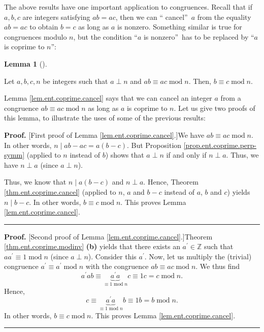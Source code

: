 \documentclass[numbers=enddot,12pt,final,onecolumn,notitlepage]{scrartcl}%
\numberwithin{exer}{subsection}
\theoremstyle{definition}
\newtheorem{lem}[theo]{Lemma}
\newenvironment{lemma}[1][]
{\begin{lem}[#1]\begin{leftbar}}
{\end{leftbar}\end{lem}}
\newenvironment{proof}[1][Proof]{\noindent\textbf{#1.} }{\ \rule{0.5em}{0.5em}}
\begin{document}
The above results have one important application to congruences. Recall that
if $a,b,c$ are integers satisfying $ab=ac$, then we can \textquotedblleft
cancel\textquotedblright\ $a$ from the equality $ab=ac$ to obtain $b=c$ as
long as $a$ is nonzero. Something similar is true for congruences modulo $n$,
but the condition \textquotedblleft$a$ is nonzero\textquotedblright\ has to be
replaced by \textquotedblleft$a$ is coprime to $n$\textquotedblright:

\begin{lemma}
\label{lem.ent.coprime.cancel}Let $a,b,c,n$ be integers such that $a\perp n$
and $ab\equiv ac\operatorname{mod}n$. Then, $b\equiv c\operatorname{mod}n$.
\end{lemma}

Lemma \ref{lem.ent.coprime.cancel} says that we can cancel an integer $a$ from
a congruence $ab\equiv ac\operatorname{mod}n$ as long as $a$ is coprime to
$n$. Let us give two proofs of this lemma, to illustrate the uses of some of
the previous results:

\begin{proof}
[First proof of Lemma \ref{lem.ent.coprime.cancel}.]We have $ab\equiv
ac\operatorname{mod}n$. In other words, $n\mid ab-ac=a\left(  b-c\right)  $.
But Proposition \ref{prop.ent.coprime.perp-symm} (applied to $n$ instead of
$b$) shows that $a\perp n$ if and only if $n\perp a$. Thus, we have $n\perp a$
(since $a\perp n$).

Thus, we know that $n\mid a\left(  b-c\right)  $ and $n\perp a$. Hence,
Theorem \ref{thm.ent.coprime.cancel} (applied to $n$, $a$ and $b-c$ instead of
$a$, $b$ and $c$) yields $n\mid b-c$. In other words, $b\equiv
c\operatorname{mod}n$. This proves Lemma \ref{lem.ent.coprime.cancel}.
\end{proof}

\begin{proof}
[Second proof of Lemma \ref{lem.ent.coprime.cancel}.]Theorem
\ref{thm.ent.coprime.modinv} \textbf{(b)} yields that there exists an
$a^{\prime}\in\mathbb{Z}$ such that $aa^{\prime}\equiv1\operatorname{mod}n$
(since $a\perp n$). Consider this $a^{\prime}$. Now, let us multiply the
(trivial) congruence $a^{\prime}\equiv a^{\prime}\operatorname{mod}n$ with the
congruence $ab\equiv ac\operatorname{mod}n$. We thus find%
\[
a^{\prime}ab\equiv\underbrace{a^{\prime}a}_{\equiv1\operatorname{mod}n}%
c\equiv1c=c\operatorname{mod}n.
\]
Hence,
\[
c\equiv\underbrace{a^{\prime}a}_{\equiv1\operatorname{mod}n}b\equiv
1b=b\operatorname{mod}n.
\]
In other words, $b\equiv c\operatorname{mod}n$. This proves Lemma
\ref{lem.ent.coprime.cancel}.
\end{proof}
\end{document}
